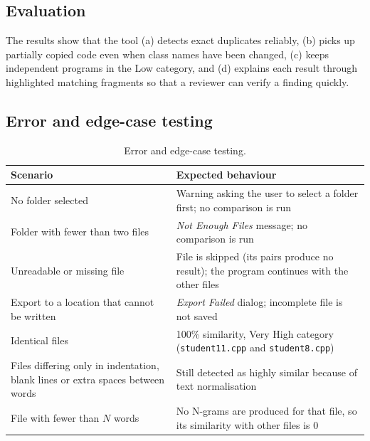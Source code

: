 \documentclass[11pt,a4paper]{report}
\newcommand{\cc}[1]{\texttt{#1}}
\begin{document}
\subsection{Evaluation}
The results show that the tool (a) detects exact duplicates reliably, (b) picks up partially
copied code even when class names have been changed, (c) keeps independent programs in the
Low category, and (d) explains each result through highlighted matching fragments so that a
reviewer can verify a finding quickly.

\subsection{Error and edge-case testing}
\begin{table}[htbp]
\centering
\small
\begin{tabular}{@{}p{5.2cm} p{9.8cm}@{}}
\toprule
Scenario & Expected behaviour \\
\midrule
No folder selected & Warning asking the user to select a folder first; no comparison is
  run \\
Folder with fewer than two files & \emph{Not Enough Files} message; no comparison is run \\
Unreadable or missing file & File is skipped (its pairs produce no result); the program
  continues with the other files \\
Export to a location that cannot be written & \emph{Export Failed} dialog; incomplete file
  is not saved \\
Identical files & 100\% similarity, Very High category (\cc{student11.cpp} and
  \cc{student8.cpp}) \\
Files differing only in indentation, blank lines or extra spaces between words & Still
  detected as highly similar because of text normalisation \\
File with fewer than $N$ words & No N-grams are produced for that file, so its similarity
  with other files is 0 \\
\bottomrule
\end{tabular}
\caption{Error and edge-case testing.}
\label{tab:edge}
\end{table}

\end{document}
